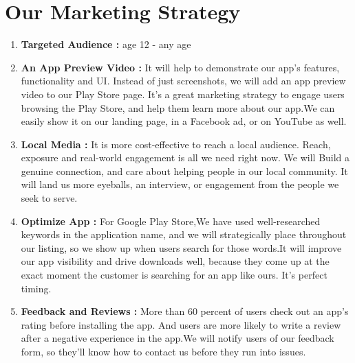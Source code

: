 \section{Our Marketing Strategy}
\begin{enumerate}
    \item \textbf{Targeted Audience :}  age 12 - any age
    \item \textbf{An App Preview Video : }  It will help to demonstrate our app’s features, functionality and UI. Instead of just screenshots, we
    will add an app preview video to our Play Store page. It’s a great marketing strategy to engage users browsing the Play Store, and help them learn more about our app.We can easily show it on our landing page, in a Facebook ad, or on YouTube as well.
    \item \textbf{Local Media : } It is more cost-effective to reach a local audience. Reach, exposure and real-world engagement is all we need right now. We will Build a genuine connection, and care about helping people in our local community. It will land us more eyeballs, an interview, or engagement from the people we seek to serve.
    \item \textbf{Optimize App  : } For Google Play Store,We have used well-researched keywords in the application name, and we will strategically place throughout our listing, so we show up when users search for those words.It will improve our app visibility and drive downloads well, because they come up at the exact moment the customer is searching for an app like ours. It’s perfect timing.
     \item \textbf{Feedback and Reviews : } More than 60 percent of users check out an app’s rating before installing the app. And users are more likely to write a review after a negative experience in the app.We will notify users of our feedback form, so they’ll know how to contact us before they run into issues.
\end{enumerate}

